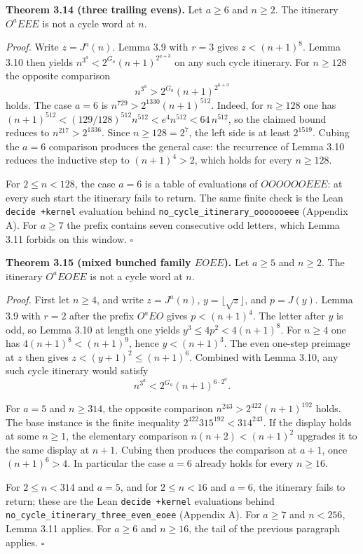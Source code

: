 \documentclass[12pt]{article}
\begin{document}
\textbf{Theorem 3.14 (three trailing evens).} Let \(a\ge 6\) and
\(n\ge 2\). The itinerary \(O^aEEE\) is not a cycle word at \(n\).

\emph{Proof.} Write \(z=J^a(n)\). Lemma 3.9 with \(r=3\) gives
\(z<(n+1)^8\). Lemma 3.10 then yields \(n^{3^a}<2^{G_a}(n+1)^{2^{a+3}}\)
on any such cycle itinerary. For \(n\ge 128\) the opposite comparison \[
n^{3^a}>2^{G_a}(n+1)^{2^{a+3}}
\] holds. The case \(a=6\) is \(n^{729}>2^{1330}(n+1)^{512}\). Indeed,
for \(n\ge 128\) one has
\((n+1)^{512}<(129/128)^{512}n^{512}<e^4 n^{512}<64\,n^{512}\), so the
claimed bound reduces to \(n^{217}>2^{1336}\). Since \(n\ge 128=2^7\),
the left side is at least \(2^{1519}\). Cubing the \(a=6\) comparison
produces the general case: the recurrence of Lemma 3.10 reduces the
inductive step to \((n+1)^4>2\), which holds for every \(n\ge 128\).

For \(2\le n<128\), the case \(a=6\) is a table of evaluations of
\(OOOOOOEEE\): at every such start the itinerary fails to return. The
same finite check is the Lean \texttt{decide\ +kernel} evaluation behind
\texttt{\nolinkurl{no_cycle_itinerary_ooooooeee}} (Appendix A). For
\(a\ge 7\) the prefix contains seven consecutive odd letters, which
Lemma 3.11 forbids on this window. \(\square\)

\textbf{Theorem 3.15 (mixed bunched family \(EOEE\)).} Let \(a\ge 5\)
and \(n\ge 2\). The itinerary \(O^aEOEE\) is not a cycle word at \(n\).

\emph{Proof.} First let \(n\ge 4\), and write \(z=J^a(n)\),
\(y=\lfloor\sqrt z\rfloor\), and \(p=J(y)\). Lemma 3.9 with \(r=2\)
after the prefix \(O^aEO\) gives \(p<(n+1)^4\). The letter after \(y\)
is odd, so Lemma 3.10 at length one yields \(y^3\le 4p^2<4(n+1)^8\). For
\(n\ge 4\) one has \(4(n+1)^8<(n+1)^9\), hence \(y<(n+1)^3\). The even
one-step preimage at \(z\) then gives \(z<(y+1)^2\le(n+1)^6\). Combined
with Lemma 3.10, any such cycle itinerary would satisfy \[
n^{3^a}<2^{G_a}(n+1)^{6\cdot 2^a}.
\]

For \(a=5\) and \(n\ge 314\), the opposite comparison
\(n^{243}>2^{422}(n+1)^{192}\) holds. The base instance is the finite
inequality \(2^{422}315^{192}<314^{243}\). If the display holds at some
\(n\ge 1\), the elementary comparison \(n(n+2)<(n+1)^2\) upgrades it to
the same display at \(n+1\). Cubing then produces the comparison at
\(a+1\), once \((n+1)^6>4\). In particular the case \(a=6\) already
holds for every \(n\ge 16\).

For \(2\le n<314\) and \(a=5\), and for \(2\le n<16\) and \(a=6\), the
itinerary fails to return; these are the Lean \texttt{decide\ +kernel}
evaluations behind
\texttt{\nolinkurl{no_cycle_itinerary_three_even_eoee}} (Appendix A).
For \(a\ge 7\) and \(n<256\), Lemma 3.11 applies. For \(a\ge 6\) and
\(n\ge 16\), the tail of the previous paragraph applies. \(\square\)
\end{document}
